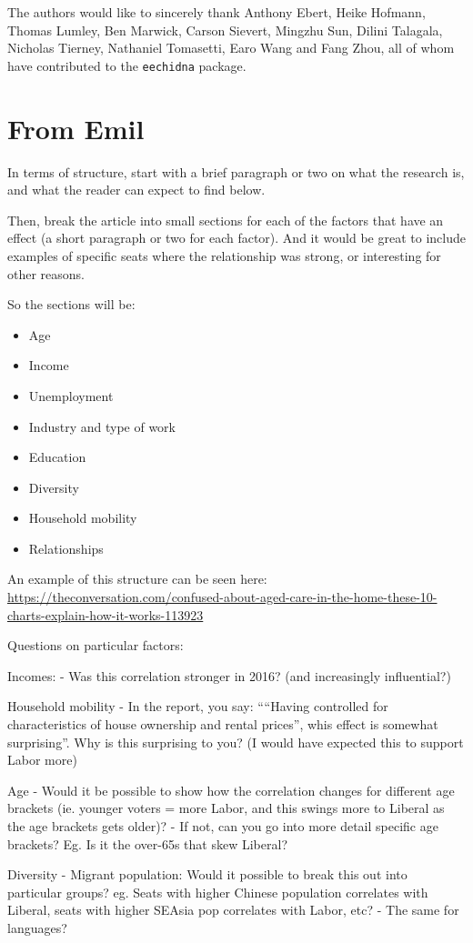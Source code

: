 \documentclass[11pt,a4paper,]{article}
\providecommand{\tightlist}{%
  \setlength{\itemsep}{0pt}\setlength{\parskip}{0pt}}
\begin{document}
The authors would like to sincerely thank Anthony Ebert, Heike Hofmann, Thomas Lumley, Ben Marwick, Carson Sievert, Mingzhu Sun, Dilini Talagala, Nicholas Tierney, Nathaniel Tomasetti, Earo Wang and Fang Zhou, all of whom have contributed to the \texttt{eechidna} package.

\hypertarget{from-emil}{%
\section{From Emil}\label{from-emil}}

In terms of structure, start with a brief paragraph or two on what the research is, and what the reader can expect to find below.

Then, break the article into small sections for each of the factors that have an effect (a short paragraph or two for each factor). And it would be great to include examples of specific seats where the relationship was strong, or interesting for other reasons.

So the sections will be:

\begin{itemize}
\tightlist
\item
  Age
\item
  Income
\item
  Unemployment
\item
  Industry and type of work
\item
  Education
\item
  Diversity
\item
  Household mobility
\item
  Relationships
\end{itemize}

An example of this structure can be seen here:
\url{https://theconversation.com/confused-about-aged-care-in-the-home-these-10-charts-explain-how-it-works-113923}

Questions on particular factors:

Incomes:
- Was this correlation stronger in 2016? (and increasingly influential?)

Household mobility
- In the report, you say: ````Having controlled for characteristics of house ownership and rental prices'', whis effect is somewhat surprising''. Why is this surprising to you? (I would have expected this to support Labor more)

Age
- Would it be possible to show how the correlation changes for different age brackets (ie. younger voters = more Labor, and this swings more to Liberal as the age brackets gets older)?
- If not, can you go into more detail specific age brackets? Eg. Is it the over-65s that skew Liberal?

Diversity
- Migrant population: Would it possible to break this out into particular groups? eg. Seats with higher Chinese population correlates with Liberal, seats with higher SEAsia pop correlates with Labor, etc?
- The same for languages?

\printbibliography
\end{document}
